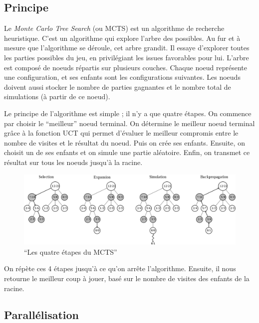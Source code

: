 \documentclass[a4paper,11pt]{article}
\begin{document}
\subsection{Principe}\label{principe}

Le \emph{Monte Carlo Tree Search} (ou MCTS) est un algorithme de
recherche heuristique. C'est un algorithme qui explore l'arbre des
possibles. Au fur et à mesure que l'algorithme se déroule, cet arbre
grandit. Il essaye d'explorer toutes les parties possibles du jeu, en
privilégiant les issues favorables pour lui. L'arbre est composé de
noeuds répartis sur plusieurs couches. Chaque noeud représente une
configuration, et ses enfants sont les configurations suivantes. Les
noeuds doivent aussi stocker le nombre de parties gagnantes et le nombre
total de simulations (à partir de ce noeud).

Le principe de l'algorithme est simple ; il n'y a que quatre étapes. On
commence par choisir le ``meilleur'' noeud terminal. On détermine le
meilleur noeud terminal grâce à la fonction UCT qui permet d'évaluer le
meilleur compromis entre le nombre de visites et le résultat du noeud.
Puis on crée ses enfants. Ensuite, on choisit un de ses enfants et on
simule une partie aléatoire. Enfin, on transmet ce résultat sur tous les
noeuds jusqu'à la racine.

\begin{figure}
\centering
\includegraphics{mcts.png}
\caption{``Les quatre étapes du MCTS''}
\end{figure}

On répète ces 4 étapes jusqu'à ce qu'on arrête l'algorithme. Ensuite, il
nous retourne le meilleur coup à jouer, basé sur le nombre de visites
des enfants de la racine.

\subsection{Parallélisation}\label{paralluxe9lisation}
\end{document}
